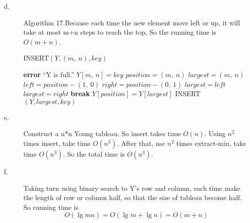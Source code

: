 \documentclass{article}
\begin{document}
\begin{description}
\item[d. ] Algorithm 17.Because each time the new element move left or up, it will take at most m+n steps to reach the top, So the running time is $O(m+n)$.
  \begin{algorithm}
    \caption{INSERT$(Y, (m,\ n), key)$}
    \begin{algorithmic}[1]
      \STATE \textbf{error} ``Y is full.''
      \ENDIF
      \STATE $Y[m,\ n] = key$
      \STATE $position = (m,\ n)$
      \STATE $largest = (m,\ n)$
      \STATE $left = position - (1,\ 0)$
      \STATE $right = position - (0,\ 1)$
      \STATE $largest = left$
      \ENDIF
      \STATE $largest = right$
      \ENDIF
      \STATE \textbf{break}
      \ELSE
      \STATE $Y[position] = Y[largest]$
      \STATE INSERT$(Y, largest, key)$
      \ENDIF
      \ENDWHILE
    \end{algorithmic}
  \end{algorithm}

\item[e. ] Construct a n*n Young tableau. So insert takes time $O(n)$. Using $n^2$ times insert, take time $O(n^3)$. After that, use $n^2$ times extract-min, take time $O(n^3)$.  So the total time is $O(n^3)$.

\item[f. ]   Taking turn using binary search to Y's row and column, each time make the length of row or column half, so that the size of tableau become half. So running time is
\[O(\lg mn) = O(\lg m + \lg n) = O(m+n)\]

\end{description}
\end{document}
